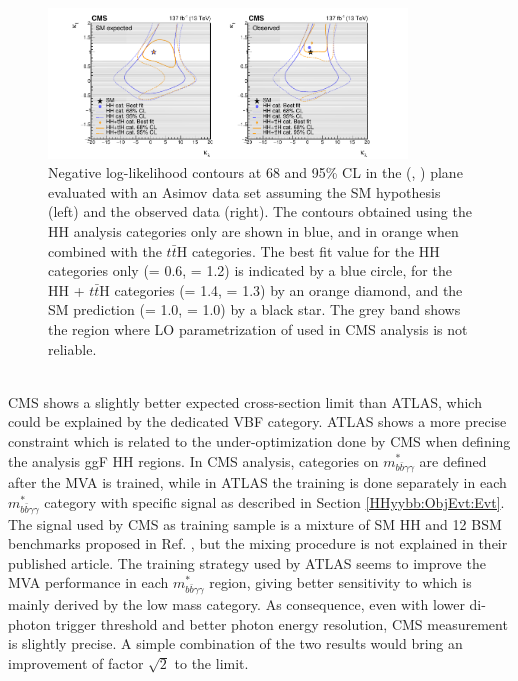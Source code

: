 \begin{figure}[htbp]
    \centering
    \includegraphics[width=0.85\textwidth]{Ch5/Img/CMS-HIG-19-018_kl_LH.pdf}
    \caption{Negative log-likelihood contours at 68 and 95\% CL in the (\kl, \kt) plane evaluated with an Asimov data set assuming the SM hypothesis (left) and the observed data (right). The contours obtained using the HH analysis categories only are shown in blue, and in orange when combined with the $t\bar{t}$H categories. The best fit value for the HH categories only (\kl = 0.6, \kt = 1.2) is indicated by a blue circle, for the HH + $t\bar{t}$H categories (\kl = 1.4, \kl = 1.3) by an orange diamond, and the SM prediction (\kl = 1.0, \kt = 1.0) by a black star. The grey band shows the region where LO parametrization of \kt used in CMS analysis is not reliable. }
    \label{fig:HHyybb:CMS:LH:2D}
\end{figure}
\\
CMS shows a slightly better expected cross-section limit than ATLAS, which could be explained by the dedicated VBF category. ATLAS shows a more precise \kl constraint which is related to the under-optimization done by CMS when defining the analysis ggF HH regions. In CMS analysis, categories on $m_{b \bar{b} \gamma \gamma}^{*}$ are defined after the MVA is trained, while in ATLAS the training is done separately in each $m_{b \bar{b} \gamma \gamma}^{*}$ category with specific signal as described in Section \ref{HHyybb:ObjEvt:Evt}. The signal used by CMS as training sample is a mixture of SM HH and 12 BSM benchmarks proposed in Ref. \cite{CMS_BSM}, but the mixing procedure is not explained in their published article. The training strategy used by ATLAS seems to improve the MVA performance in each $m_{b \bar{b} \gamma \gamma}^{*}$ region, giving better sensitivity to \kl which is mainly derived by the low mass category. As consequence, even with lower di-photon trigger threshold and better photon energy resolution, CMS measurement is slightly precise. A simple combination of the two results would bring an improvement of factor $\sqrt{2}$ to the limit. \\


